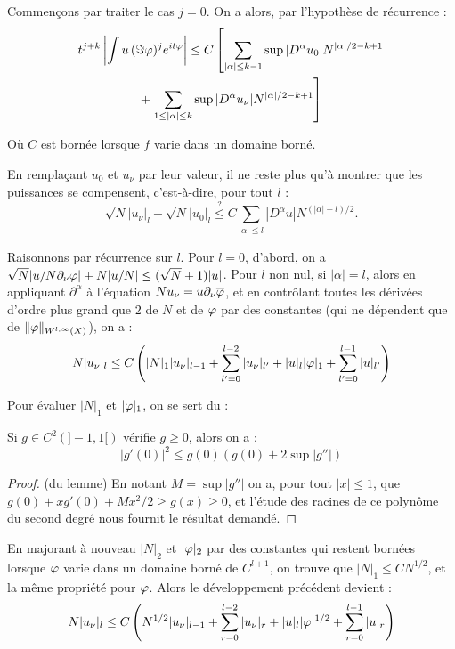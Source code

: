 Commençons par traiter le cas $j=0$. On a alors, par l'hypothèse de récurrence :
\begin{multline*}
  t^{j+k}\left|\int u\,(\Im \varphi)^je^{it\varphi} \right| \leq
  C\left[\sum_{|\alpha| \leq k-1}\sup |D^{\alpha}u_0|N^{|\alpha|/2-k+1}\right. \\+
    \left.\sum_{1 \leq |\alpha| \leq k}\sup
    |D^{\alpha}u_{\nu}|N^{|\alpha|/2-k+1}\right] 
\end{multline*}

\noindent Où $C$ est bornée lorsque $f$ varie dans un domaine borné.

En remplaçant $u_0$ et $u_{\nu}$ par leur valeur, il ne reste plus qu'à montrer que les puissances se compensent, c'est-à-dire, pour tout $l$ :
\begin{equation*}
  \sqrt{N}|u_{\nu}|_l + \sqrt{N}|u_0|_l \stackrel{?}{\leq} C \sum_{|\alpha| \leq l}|D^{\alpha}u|N^{(|\alpha|-l)/2}.
\end{equation*}

Raisonnons par récurrence sur $l$. Pour $l=0$, d'abord, on a  $\sqrt{N} |u/N \partial_{\nu}\varphi| + N |u/N| \leq (\sqrt{N}+1)|u|$. Pour $l$ non nul, si $|\alpha|=l$, alors en appliquant $\partial^{\alpha}$ à l'équation $Nu_{\nu}=u \partial_{\nu}\overline{\varphi}$, et en contrôlant toutes les dérivées d'ordre plus grand que $2$ de $N$ et de $\varphi$ par des constantes (qui ne dépendent que de $\|\varphi\|_{W^{l,\infty}(X)}$), on a :
\begin{equation*}
  N|u_{\nu}|_l \leq C\left(|N|_1|u_{\nu}|_{l-1} + \sum_{l'=0}^{l-2}|u_{\nu}|_{l'} + |u|_l|\varphi|_1 + \sum_{l'=0}^{l-1}|u|_{l'}\right)
\end{equation*}

Pour évaluer $|N|_1$ et $|\varphi|_1$, on se sert du :
\begin{lem}
  \label{horm7.7.2}
  Si $g \in C^2(]-1,1[)$ vérifie $g \geq 0$, alors on a :
  \begin{equation*}
    |g'(0)|^2 \leq g(0)\left(g(0) + 2 \sup |g''|\right)
  \end{equation*}
\end{lem}
\begin{proof} (du lemme) En notant $M= \sup |g''|$ on a, pour tout $|x| \leq 1$, que $g(0)+xg'(0)+Mx^2/2 \geq g(x) \geq 0$, et l'étude des racines de ce polynôme du second degré nous fournit le résultat demandé.\end{proof}

En majorant à nouveau $|N|_2$ et $|\varphi|_2$ par des constantes qui restent bornées lorsque $\varphi$ varie dans un domaine borné de $C^{l+1}$, on trouve que $|N|_1 \leq C N^{1/2}$, et la même propriété pour $\varphi$. Alors le développement précédent devient :
\begin{equation*}
  N|u_{\nu}|_l \leq C\left(N^{1/2}|u_{\nu}|_{l-1} + \sum_{r=0}^{l-2}|u_{\nu}|_{r} + |u|_l|\varphi|^{1/2} + \sum_{r=0}^{l-1}|u|_{r}\right)
\end{equation*}

